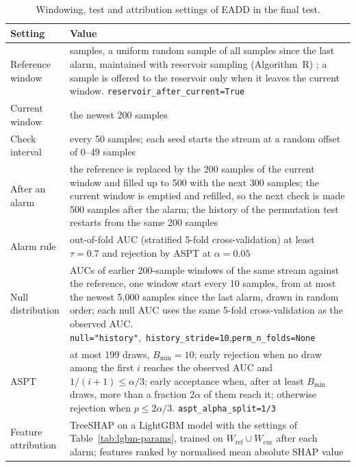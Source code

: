 \begin{table}[!htbp]
\centering
\caption{Windowing, test and attribution settings of EADD in the final test.}\label{tab:eadd-settings}
\small
\begin{tabular}{>{\raggedright\arraybackslash}p{3.3cm}>{\raggedright\arraybackslash}p{10.1cm}}
\toprule
Setting & Value \\
\midrule
Reference window & 500 samples, a uniform random sample of all samples since the last alarm, maintained with reservoir sampling (Algorithm~R) \citep{Vitter1985}; a sample is offered to the reservoir only when it leaves the current window. \newline\mbox{\footnotesize\texttt{reservoir\_after\_current=True}} \\
\addlinespace
Current window & the newest 200 samples \\
\addlinespace
Check interval & every 50 samples; each seed starts the stream at a random offset of 0--49 samples \\
\addlinespace
After an alarm & the reference is replaced by the 200 samples of the current window and filled up to 500 with the next 300 samples; the current window is emptied and refilled, so the next check is made 500 samples after the alarm; the history of the permutation test restarts from the same 200 samples \\
\addlinespace
Alarm rule & out-of-fold AUC (stratified 5-fold cross-validation) at least $\tau = 0.7$ and rejection by ASPT at $\alpha = 0.05$ \\
\addlinespace
Null distribution & AUCs of earlier 200-sample windows of the same stream against the reference, one window start every 10 samples, from at most the newest 5,000 samples since the last alarm, drawn in random order; each null AUC uses the same 5-fold cross-validation as the observed AUC. \newline\mbox{\footnotesize\texttt{null="history"}, \texttt{history\_stride=10},}\newline\mbox{\footnotesize\texttt{perm\_n\_folds=None}} \\
\addlinespace
ASPT & at most 199 draws, $B_{\min} = 10$; early rejection when no draw among the first $i$ reaches the observed AUC and $1/(i+1) \leq \alpha/3$; early acceptance when, after at least $B_{\min}$ draws, more than a fraction $2\alpha$ of them reach it; otherwise rejection when $p \leq 2\alpha/3$. \newline\mbox{\footnotesize\texttt{aspt\_alpha\_split=1/3}} \\
\addlinespace
Feature attribution & TreeSHAP on a LightGBM model with the settings of Table~\ref{tab:lgbm-params}, trained on $W_{\mathrm{ref}} \cup W_{\mathrm{cur}}$ after each alarm; features ranked by normalised mean absolute SHAP value \\
\bottomrule
\end{tabular}
\end{table}
